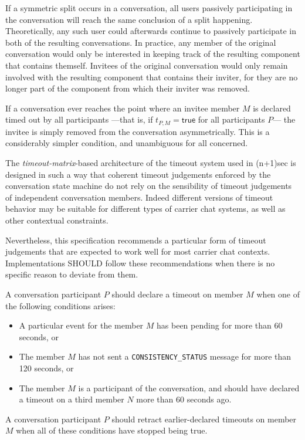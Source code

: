 \documentclass{article}
\def\message#1{\texttt{#1}}
\def\smfield#1{\textsl{#1}}
\begin{document}
If a symmetric split occurs in a conversation, all users passively participating in the conversation will reach the same conclusion of a split happening.
Theoretically, any such user could afterwards continue to passively participate in both of the resulting conversations.
In practice, any member of the original conversation would only be interested in keeping track of the resulting component that contains themself.
Invitees of the original conversation would only remain involved with the resulting component that contains their inviter, for they are no longer part of the component from which their inviter was removed.

If a conversation ever reaches the point where an invitee member $M$ is declared timed out by all participants ---that is, if $t_{P, M} = \textsf{true}$ for all participants $P$--- the invitee is simply removed from the conversation asymmetrically.
This is a considerably simpler condition, and unambiguous for all concerned.


The \smfield{timeout-matrix}-based architecture of the timeout system used in (n+1)sec is designed in such a way that coherent timeout judgements enforced by the conversation state machine do not rely on the sensibility of timeout judgements of independent conversation members.
Indeed different versions of timeout behavior may be suitable for different types of carrier chat systems, as well as other contextual constraints.

Nevertheless, this specification recommends a particular form of timeout judgements that are expected to work well for most carrier chat contexts.
Implementations SHOULD follow these recommendations when there is no specific reason to deviate from them.

A conversation participant $P$ should declare a timeout on member $M$ when one of the following conditions arises:
\begin{itemize}
\item A particular event for the member $M$ has been pending for more than 60 seconds, or
\item The member $M$ has not sent a \message{CONSISTENCY\_STATUS} message for more than 120 seconds, or
\item The member $M$ is a participant of the conversation, and should have declared a timeout on a third member $N$ more than 60 seconds ago.
\end{itemize}
A conversation participant $P$ should retract earlier-declared timeouts on member $M$ when all of these conditions have stopped being true.
\end{document}
